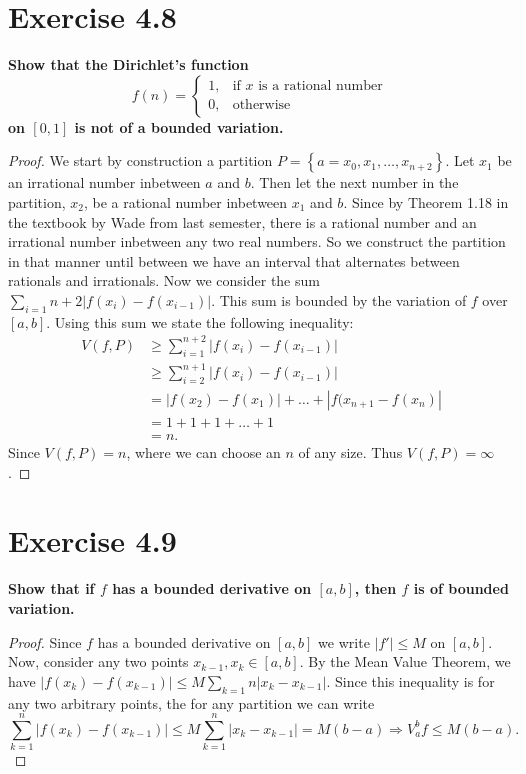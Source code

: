 \documentclass[paper=a4, fontsize=11pt]{scrartcl} %
\begin{document}
\section*{Exercise 4.8}
\boldmath
\textbf{Show that the Dirichlet's function 
$$
f(n) =
\begin{cases}
1, & \text{if } x \text{ is a rational number} \\
0, & \text{otherwise}
\end{cases}
$$
on $[0, 1]$ is not of a bounded variation.
}
\unboldmath
\begin{proof}
We start by construction a partition $P = \left \{ a = x_0, x_1, \dots , x_{n + 2}\right \}$.
\newline
Let $x_1$ be an irrational number inbetween $a$ and $b$.  Then let the next number in the partition, $x_2$, be a rational number inbetween $x_1$ and $b$.  Since by Theorem 1.18 in the textbook by Wade from last semester, there is a rational number and an irrational number inbetween any two real numbers.  So we construct the partition in that manner until between we have an interval that alternates between rationals and irrationals.
\newline
Now we consider the sum $\sum_{i = 1}{n +2} \left | f(x_i) - f(x_{i -1}) \right |$.  This sum is bounded by the variation of $f$ over $[a, b]$.  Using this sum we state the following inequality:
\begin{align*}
\	V(f, P) &\geq \sum_{i=1}^{n+2} \left | f(x_i) - f(x_{i-1}) \right |
\\	&\geq \sum_{i=2}^{n+1} \left | f(x_i) - f(x_{i-1}) \right |
\\	&= \left | f(x_2) - f(x_1) \right | + \dots + \left | f(x_{n+1} - f(x_n) \right |
\\ &= 1 + 1 + 1 + \dots + 1
\\ &= n.
\end{align*}
Since $V(f, P) = n$, where we can choose an $n$ of any size.  Thus $V(f, P) = \infty$.
\end{proof}


\section*{Exercise 4.9}
\boldmath
\textbf{Show that if $f$ has a bounded derivative on $[a, b]$, then $f$ is of bounded variation.}
\unboldmath
\begin{proof}
Since $f$ has a bounded derivative on $[a, b]$ we write $\left | f' \right | \leq M$ on $[a, b]$.  Now, consider any two points $x_{k-1}, x_k \in [a, b]$.  By the Mean Value Theorem, we have $ \left | f(x_k) - f(x_{k-1}) \right | \leq M \sum_{k=1}{n} \left | x_k - x_{k-1} \right |$.  Since this inequality is for any two arbitrary points, the for any partition we can write
$$ \sum_{k=1}^{n} \left | f(x_k) - f(x_{k-1}) \right | \leq M \sum_{k=1}^{n} \left | x_k - x_{k-1} \right | = M(b -a) \Rightarrow V_a^b f \leq M(b-a).$$
\end{proof}
\end{document}
